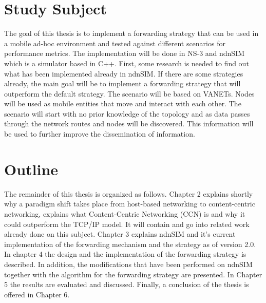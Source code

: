 \section{Study Subject}

The goal of this thesis is to implement a forwarding strategy that can be used in a mobile ad-hoc environment and tested against different scenarios for performance metrics. The implementation will be done in NS-3 and ndnSIM which is a simulator based in C++. First, some research is needed to find out what has been implemented already in ndnSIM. If there are some strategies already, the main goal will be to implement a forwarding strategy that will outperform the default strategy. The scenario will be based on VANETs. Nodes will be used as mobile entities that move and interact with each other. The scenario will start with no prior knowledge of the topology and as data passes through the network routes and nodes will be discovered. This information will be used to further improve the dissemination of information.

\section{Outline}

The remainder of this thesis is organized as follows. Chapter 2 explains shortly why a paradigm shift takes place from host-based networking to content-centric networking, explains what Content-Centric Networking (CCN) is and why it could outperform the TCP/IP model. It will contain and go into related work already done on this subject. Chapter 3 explains ndnSIM and it's current implementation of the forwarding mechanism and the strategy as of version 2.0. In chapter 4 the design and the implementation of the forwarding strategy is described. In addition, the modifications that have been performed on ndnSIM together with the algorithm for the forwarding strategy are presented. In Chapter 5 the results are evaluated and discussed. Finally, a conclusion of the thesis is offered in Chapter 6.